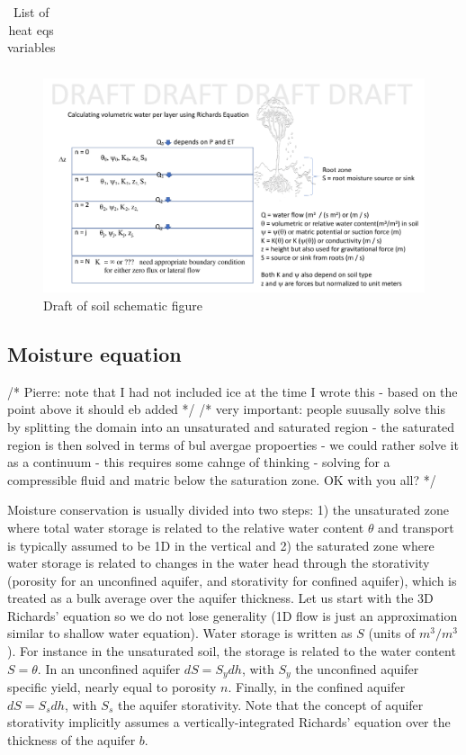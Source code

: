 \documentclass{article}
\begin{document}
\begin{table}[]
{\begin{tabular}{lllll}
\hline
\end{tabular}%
}
\caption{List of heat eqs variables}
\end{table}

\begin{figure}[htb]
\includegraphics[scale=.15]{CLIMA-land/LM_figures/SoilSchematic-1.png}
\caption{Draft of soil schematic figure}
\end{figure}





\subsection{Moisture equation}
/* Pierre: note that I had not included ice at the time I wrote this - based on the point above it should eb added */
/* very important: people suusally solve this by splitting the domain into an unsaturated and saturated region - the saturated region is then solved in terms of bul avergae propoerties - we could rather solve it as a continuum - this requires some cahnge of thinking - solving for a compressible fluid and matric below the saturation zone. OK with you all? */

Moisture conservation is usually divided into two steps: 1) the unsaturated zone where total water storage is related to the relative water content $\theta$ and transport is typically assumed to be 1D in the vertical and 2) the saturated zone where water storage is related to changes in the water head through the storativity (porosity for an unconfined aquifer, and storativity for confined aquifer), which is treated as a bulk average over the aquifer thickness. 
Let us start with the 3D Richards' equation so we do not lose generality (1D flow is just an approximation similar to shallow water equation). Water storage is written as $S$ (units of $m^3/m^3$). For instance in the unsaturated soil, the storage is related to the water content $S=\theta$. In an unconfined aquifer $dS=S_y dh$, with $S_y$ the unconfined aquifer specific yield, nearly equal to porosity $n$. Finally, in the confined aquifer $dS=S_s dh$, with $S_s$ the aquifer storativity. Note that the concept of aquifer storativity implicitly assumes a vertically-integrated Richards' equation over the thickness of the aquifer $b$. 
\end{document}

